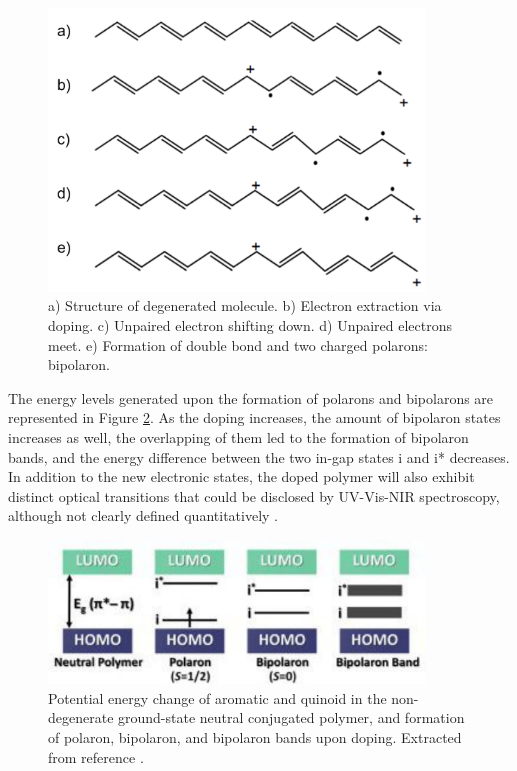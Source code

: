 \begin{figure}[h]
  \centering
  \includegraphics[width=10cm]{Images/pdf/bipolaron.pdf}
  \caption[Representation of bipolaron formation introduced via doping]{a) Structure of degenerated molecule. b) Electron extraction via doping. c) Unpaired electron shifting down. d) Unpaired electrons meet. e) Formation of double bond and two charged polarons: bipolaron.}
  \label{fig:bipol}
\end{figure}

The energy levels generated upon the formation of polarons and bipolarons are represented in Figure \ref{fig:ebipol}. As the doping increases, the amount of bipolaron states increases as well, the overlapping of them led to the formation of bipolaron bands, and the energy difference between the two in-gap states i and i* decreases. %
In addition to the new electronic states, the doped polymer will also exhibit distinct optical transitions that could be disclosed by UV-Vis-NIR spectroscopy, although not clearly defined quantitatively \cite{heydarigharahcheshmehTextureNanostructuralEngineering2020}.

\begin{figure}[h]
  \centering
  \includegraphics[width=10cm]{Images/pdf/bi-polaron.pdf}
  \caption[Formation of polaron, bipolaron, and bipolaron band]{Potential energy change of aromatic and quinoid in the non-degenerate ground-state neutral conjugated polymer, and formation of polaron, bipolaron, and bipolaron bands upon doping. Extracted from reference \cite{heydarigharahcheshmehTextureNanostructuralEngineering2020}.}
  \label{fig:ebipol}
\end{figure}

